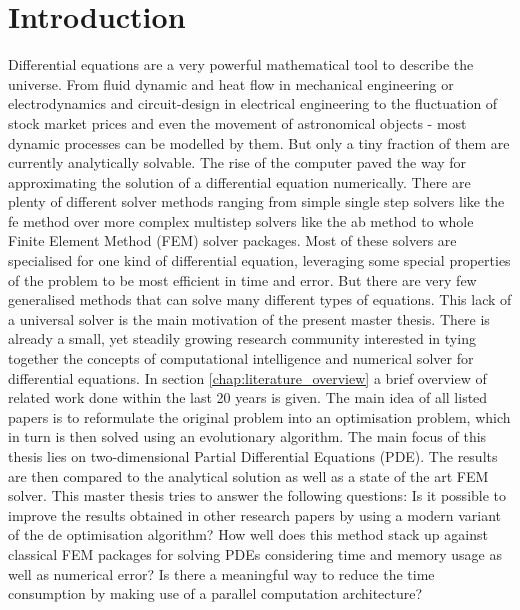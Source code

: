 \documentclass[./\jobname.tex]{subfiles}
\begin{document}
\section{Introduction}

Differential equations are a very powerful mathematical tool to describe the universe. From fluid dynamic and heat flow in mechanical engineering or electrodynamics and circuit-design in electrical engineering to the fluctuation of stock market prices and even the movement of astronomical objects - most dynamic processes can be modelled by them. But only a tiny fraction of them are currently analytically solvable. The rise of the computer paved the way for approximating the solution of a differential equation numerically. There are plenty of different solver methods ranging from simple single step solvers like the \gls{fe} method over more complex multistep solvers like the \gls{ab} method to whole Finite Element Method (FEM) solver packages. Most of these solvers are specialised for one kind of differential equation, leveraging some special properties of the problem to be most efficient in time and error. But there are very few generalised methods that can solve many different types of equations. This lack of a universal solver is the main motivation of the present master thesis. There is already a small, yet steadily growing research community interested in tying together the concepts of computational intelligence and numerical solver for differential equations. In section \ref{chap:literature_overview} a brief overview of related work done within the last 20 years is given. The main idea of all listed papers is to reformulate the original problem into an optimisation problem, which in turn is then solved using an evolutionary algorithm. The main focus of this thesis lies on two-dimensional Partial Differential Equations (PDE). The results are then compared to the analytical solution as well as a state of the art FEM solver. This master thesis tries to answer the following questions: Is it possible to improve the results obtained in other research papers by using a modern variant of the \gls{de} optimisation algorithm? How well does this method stack up against classical FEM packages for solving PDEs considering time and memory usage as well as numerical error? Is there a meaningful way to reduce the time consumption by making use of a parallel computation architecture? 
\end{document}
